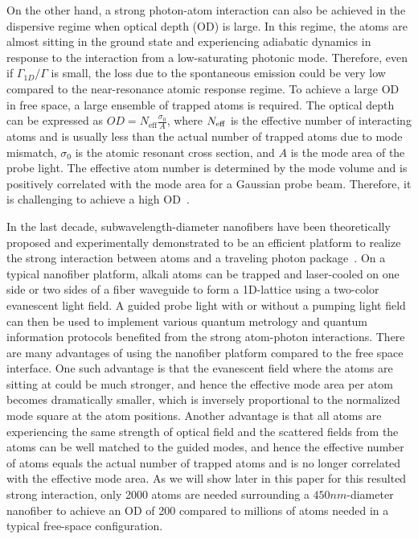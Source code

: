 \documentclass[preprint,aps,pra,onecolumn]{revtex4-1} %
\begin{document}
On the other hand, a strong photon-atom interaction can also be achieved in the dispersive regime when optical depth (OD) is large. In this regime, the atoms are almost sitting in the ground state and experiencing adiabatic dynamics in response to the interaction from a low-saturating photonic mode. Therefore, even if $\Gamma_{1D}/\Gamma$ is small, the loss due to the spontaneous emission could be very low compared to the near-resonance atomic response regime.  To achieve a large OD in free space, a large ensemble of trapped atoms is required. The optical depth can be expressed as $ OD=N_{\mathrm{eff}} \frac{\sigma_0}{A} $, where $ N_{\rm eff} $ is the effective number of interacting atoms and is usually less than the actual number of trapped atoms due to mode mismatch, $ \sigma_0 $ is the atomic resonant cross section, and $ A $ is the mode area of the probe light. The effective atom number is determined by the mode volume and is positively correlated with the mode area for a Gaussian probe beam. 
Therefore, it is challenging to achieve a high OD~\cite{Baragiola2014}. 

In the last decade, subwavelength-diameter nanofibers have been theoretically proposed and experimentally demonstrated to be an efficient platform to realize the strong interaction between atoms and a traveling photon package~\cite{LeKien2004,Balykin2004,Nayak2009,Nayak2008,Fu2008,Vetsch2010,Dawkins2011,Goban2012,Mitsch2014a}. On a typical nanofiber platform, alkali atoms can be trapped and laser-cooled on one side or two sides of a fiber waveguide to form a 1D-lattice using a two-color evanescent light field. A guided probe light with or without a pumping light field can then be used to implement various quantum metrology and quantum information protocols benefited from the strong atom-photon interactions. There are many advantages of using the nanofiber platform compared to the free space interface. One such advantage is that the evanescent field where the atoms are sitting at could be much stronger, and hence the effective mode area per atom becomes dramatically smaller, which is inversely proportional to the normalized mode square at the atom positions. Another advantage is that all atoms are experiencing the same strength of optical field and the scattered fields from the atoms can be well matched to the guided modes, and hence the effective number of atoms equals the actual number of trapped atoms and is no longer correlated with the effective mode area. As we will show later in this paper for this resulted strong interaction, only 2000 atoms are needed surrounding a $450nm$-diameter nanofiber to achieve an OD of 200 compared to millions of atoms needed in a typical free-space configuration. 
\end{document}
